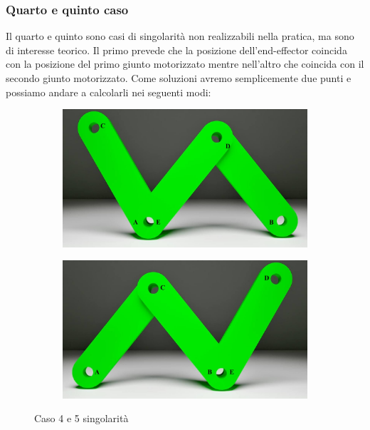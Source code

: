 \subsubsection*{Quarto e quinto caso}
Il quarto e quinto sono casi di singolarità non realizzabili nella pratica, ma sono di interesse teorico. Il primo prevede che la posizione dell'end-effector coincida con la posizione del primo giunto motorizzato mentre nell'altro che coincida con il secondo giunto motorizzato. Come soluzioni avremo semplicemente due punti e possiamo andare a calcolarli nei seguenti modi:
\begin{figure}[!ht]
	\begin{subfigure}{.5\textwidth}
		\centering
		\includegraphics[width=.9\linewidth]{Immagini/Singolarity/3}
		\label{fig:sing4}
	\end{subfigure}
	\begin{subfigure}{.5\textwidth}
		\centering
		\includegraphics[width=.9\linewidth]{Immagini/Singolarity/4}  
		\label{fig:sing5}
	\end{subfigure}
	\caption{Caso 4 e 5 singolarità}
	\label{Caso4Sing}
\end{figure}
